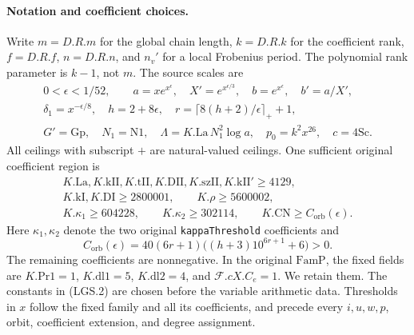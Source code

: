 \documentclass[11pt,a4paper]{article}
\numberwithin{equation}{section}
\theoremstyle{remark}\newtheorem{remark}[theorem]{Remark}
\begin{document}
\paragraph{Notation and coefficient choices.}
Write \(m=D.R.m\) for the global chain length, \(k=D.R.k\) for the
coefficient rank, \(f=D.R.f\), \(n=D.R.n\), and \(n_v'\) for a local
Frobenius period.  The polynomial rank parameter is \(k-1\), not \(m\).
The source scales are
\[
 \begin{gathered}
 0<\epsilon<1/52,\qquad
 a=xe^{x^\epsilon},\quad X'=e^{x^{\epsilon/3}},
 \quad b=e^{x^\epsilon},\quad b'=a/X',\\
 \delta_1=x^{-\epsilon/8},\quad h=2+8\epsilon,\quad
 r=\lceil8(h+2)/\epsilon\rceil_++1,\\
 G'=\mathrm{Gp},\quad N_1=\mathrm{N1},\quad
 \Lambda=K.\mathrm{La}\,N_1^2\log a,\quad
 p_0=k^2x^{26},\quad c=4\mathrm{Sc}.
 \end{gathered}                                                   \tag{LGS.1}
\]
All ceilings with subscript \(+\) are natural-valued ceilings.
One sufficient original coefficient region is
\[
 \begin{gathered}
 K.\mathrm{La},K.\mathrm{kII},K.\mathrm{tII},
 K.\mathrm{DII},K.\mathrm{szII},K.\mathrm{kII}'\ge4129,\\
 K.\mathrm{kI},K.\mathrm{DI}\ge2800001,\qquad
 K.\rho\ge5600002,\\
 K.\kappa_1\ge604228,\qquad K.\kappa_2\ge302114,
 \qquad K.\mathrm{CN}\ge C_{\mathrm{orb}}(\epsilon).
 \end{gathered}                                                   \tag{LGS.2}
\]
Here \(\kappa_1,\kappa_2\) denote the two original
\texttt{kappa\allowbreak Threshold} coefficients and
\[
 C_{\mathrm{orb}}(\epsilon)
   =40(6r+1)\bigl((h+3)10^{6r+1}+6\bigr)>0.             \tag{LGS.3}
\]
The remaining coefficients are nonnegative.  In the original
\(\mathrm{FamP}\), the fixed fields are
\(K.\mathrm{Pr1}=1\), \(K.\mathrm{dl1}=5\),
\(K.\mathrm{dl2}=4\), and \(\mathcal F.cX.C_e=1\).
We retain them.  The constants in (LGS.2) are chosen before the
variable arithmetic data.  Thresholds in \(x\) follow the fixed
family and all its coefficients, and precede every \(i,u,w,p\),
orbit, coefficient extension, and degree assignment.

\end{document}
